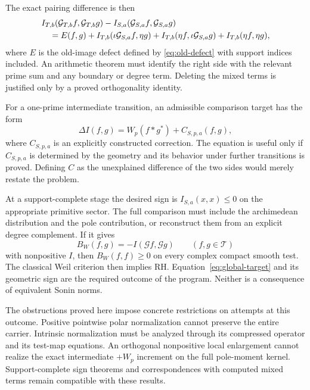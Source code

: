 \documentclass[11pt,letterpaper]{article}
\theoremstyle{definition}
\theoremstyle{remark}
\newcommand{\T}{\mathcal T}
\begin{document}
The exact pairing difference is then
\begin{align}
 &I_{T,b}(\mathcal G_{T,b}f,\mathcal G_{T,b}g)
       -I_{S,a}(\mathcal G_{S,a}f,\mathcal G_{S,a}g)\notag\\
 &\quad=E(f,g)
   +I_{T,b}(\iota\mathcal G_{S,a}f,\eta g)
   +I_{T,b}(\eta f,\iota\mathcal G_{S,a}g)
   +I_{T,b}(\eta f,\eta g),
 \label{eq:full-expansion}
\end{align}
where $E$ is the old-image defect defined by
\eqref{eq:old-defect} with support indices included.
An arithmetic theorem must identify the right side with
the relevant prime sum and any boundary or degree term.
Deleting the mixed terms is justified only by a proved
orthogonality identity.

For a one-prime intermediate transition, an admissible
comparison target has the form
\begin{equation}
 \Delta I(f,g)=W_p(f*g^*)+C_{S,p,a}(f,g),
 \label{eq:corrected-comparison}
\end{equation}
where $C_{S,p,a}$ is an explicitly constructed correction.
The equation is useful only if $C_{S,p,a}$ is determined
by the geometry and its behavior under further transitions
is proved. Defining $C$ as the unexplained difference of
the two sides would merely restate the problem.

At a support-complete stage the desired sign is
$I_{S,a}(x,x)\leq0$ on the appropriate primitive sector.
The full comparison must include the archimedean
distribution and the pole contribution, or reconstruct
them from an explicit degree complement. If it gives
\begin{equation}
 B_W(f,g)=-I(\mathcal G f,\mathcal G g)\qquad(f,g\in\T)
 \label{eq:global-target}
\end{equation}
with nonpositive $I$, then $B_W(f,f)\geq0$ on every
complex compact smooth test. The classical Weil criterion
then implies RH. Equation~\eqref{eq:global-target} and its
geometric sign are the required outcome of the program.
Neither is a consequence of equivalent Sonin norms.

The obstructions proved here impose concrete restrictions
on attempts at this outcome. Positive pointwise polar
normalization cannot preserve the entire carrier. Intrinsic
normalization must be analyzed through its compressed
operator and its test-map equations. An orthogonal
nonpositive local enlargement cannot realize the exact
intermediate $+W_p$ increment on the full pole-moment
kernel. Support-complete sign theorems and correspondences
with computed mixed terms remain compatible with these
results.
\end{document}
